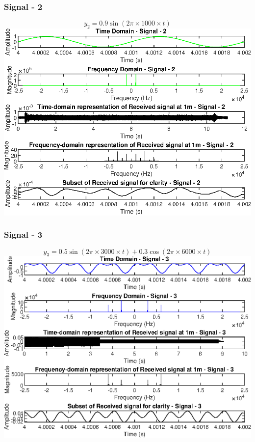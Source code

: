 \documentclass{report}
\begin{document}
\newpage
\subsubsection{Signal - 2}

$$ y_2 = 0.9 \sin(2\pi \times 1000 \times t) $$
\includegraphics[width=1.1\linewidth]{1_2.eps}


\newpage
\subsubsection{Signal - 3}

$$ y_3 = 0.5 \sin(2\pi \times 3000 \times t) + 0.3 \cos(2\pi \times 6000 \times t) $$
\includegraphics[width=1.1\linewidth]{1_3.eps}
\end{document}
